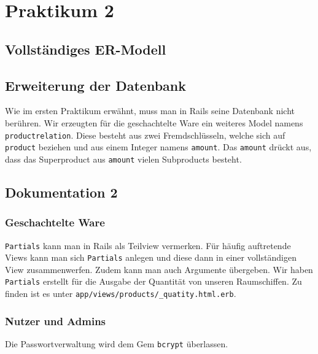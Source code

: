 \section{Praktikum 2}

\subsection{Vollst\"andiges ER-Modell}

\subsection{Erweiterung der Datenbank}
Wie im ersten Praktikum erw\"ahnt, muss man in Rails seine Datenbank nicht ber\"uhren. Wir erzeugten f\"ur die geschachtelte Ware ein weiteres Model namens \texttt{productrelation}. Diese besteht aus zwei Fremdschl\"usseln, welche sich auf \texttt{product} beziehen und aus einem Integer namens \texttt{amount}. Das \texttt{amount} dr\"uckt aus, dass das Superproduct aus \texttt{amount} vielen Subproducts besteht. 

\subsection{Dokumentation 2}

\subsubsection{Geschachtelte Ware}
\texttt{Partials} kann man in Rails als Teilview vermerken. F\"ur h\"aufig auftretende Views kann man sich \texttt{Partials} anlegen und diese dann in einer vollst\"andigen View zusammenwerfen. Zudem kann man auch Argumente \"ubergeben. Wir haben \texttt{Partials} erstellt f\"ur die Ausgabe der Quantit\"at von unseren Raumschiffen. Zu finden ist es unter \texttt{app/views/products/\_quatity.html.erb}. 

\subsubsection{Nutzer und Admins}
Die Passwortverwaltung wird dem Gem \texttt{bcrypt} \"uberlassen. 
